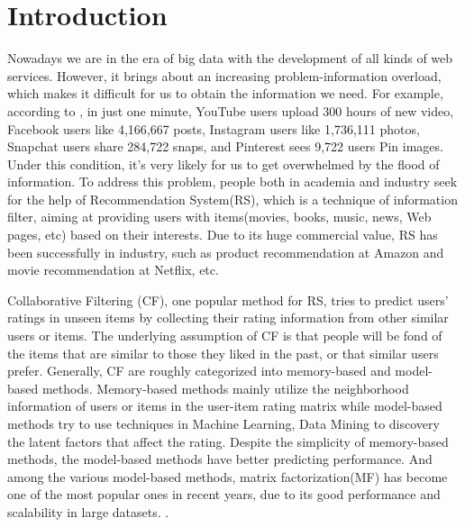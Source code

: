 
\section{Introduction}
Nowadays we are in the era of big data with the development of all kinds of web services. However, it brings about an increasing problem-information overload, which makes it difficult for us to obtain the information we need. For example, according to \cite{stats_url}, in just one minute, YouTube users upload 300 hours of new video, Facebook users like 4,166,667 posts, Instagram users like 1,736,111 photos, Snapchat users share 284,722 snaps, and Pinterest sees 9,722 users Pin images. Under this condition, it's very likely for us to get overwhelmed by the flood of information. To address this problem, people both in academia and industry seek for the help of Recommendation System(RS), which is a technique of information filter, aiming at providing users with items(movies, books, music, news, Web pages, etc) based on their interests. Due to its huge commercial value, RS has been successfully in industry, such as product recommendation at Amazon and movie recommendation at Netflix, etc. 

Collaborative Filtering (CF), one popular method for RS, tries to predict users' ratings in unseen items by collecting their rating information from other similar users or items. The underlying assumption of CF is that people will be fond of the items that are similar to those they liked in the past, or that similar users prefer. Generally, CF are roughly categorized into memory-based and model-based methods. Memory-based methods mainly utilize the neighborhood information of users or items in the user-item rating matrix while model-based methods try to use techniques in Machine Learning, Data Mining to discovery the latent factors that affect the rating. Despite the simplicity of memory-based methods, the model-based methods have better predicting performance. And among the various model-based methods, matrix factorization(MF) has become one of the most popular ones in recent years, due to its good performance and scalability in large datasets. \cite{koren2009matrix}\cite{mnih2007probabilistic}.


